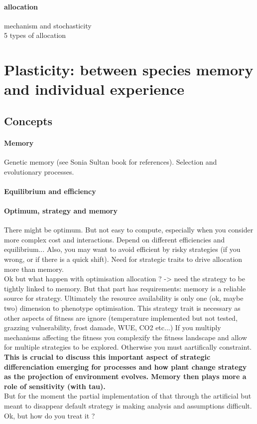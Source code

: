 \paragraph{allocation}
mechanism and stochasticity\\
5 types of allocation\\

\section{Plasticity: between species memory and individual experience}

\subsection{Concepts}
\paragraph{Memory} Genetic memory (see Sonia Sultan book for references). Selection and evolutionary processes.
\paragraph{Equilibrium and efficiency}
\paragraph{Optimum, strategy and memory} There might be optimum. But not easy to compute, especially when you consider more complex cost and interactions. Depend on different efficiencies and equilibrium... Also, you may want to avoid efficient by risky strategies (if you wrong, or if there is a quick shift). Need for strategic traits to drive allocation more than memory.\\
Ok but what happen with optimisation allocation ? -> need the strategy to be tightly linked to memory. But that part has requirements: memory is a reliable source for strategy. Ultimately the resource availability is only one (ok, maybe two) dimension to phenotype optimisation. This strategy trait is necessary as other aspects of fitness are ignore (temperature implemented but not tested, grazzing vulnerability, frost damade, WUE, CO2 etc...) If you multiply mechanisms affecting the fitness you complexify the fitness landscape and allow for multiple strategies to be explored. Otherwise you must aartifically constraint. \\

\indent \textbf{This is crucial to discuss this important aspect of strategic differenciation emerging for processes and how plant change strategy as the projection of environment evolves. Memory then plays more a role of sensitivity (with tau).}\\
But for the moment the partial implementation of that through the artificial but meant to disappear default strategy is making analysis and assumptions difficult. Ok, but how do you treat it ? 

